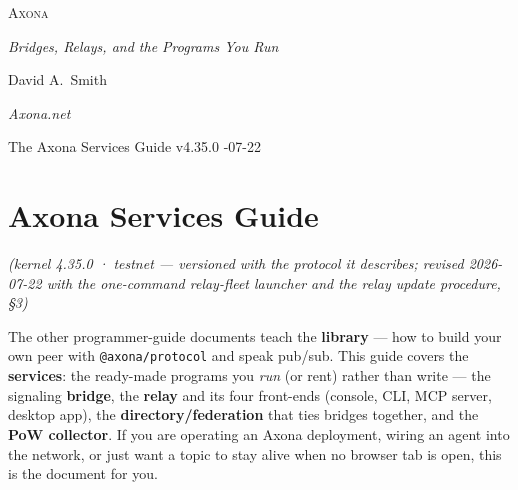 \documentclass[
  nobib]{tufte-handout}
\author{}
\date{}
\begin{document}
\thispagestyle{empty}
\null\vfill
\begin{center}
{\fontsize{48}{52}\selectfont \textsc{Axona}\par}
\vspace{0.6em}
{\Large\itshape Bridges, Relays, and the Programs You Run\par}
\vspace{4em}
{\large David A.~Smith\par}
{\itshape\small Axona.net\par}
\vspace{2em}
{\small The Axona Services Guide \quad v4.35.0 -07-22\par}
\end{center}
\vfill
\null
\newpage
\pagestyle{ndhtplain}
\thispagestyle{ndhtplain}
\setcounter{page}{1}

\section{Axona Services Guide}\label{axona-services-guide}

\emph{(kernel 4.35.0 · testnet --- versioned with the protocol it
describes; revised 2026-07-22 with the one-command relay-fleet launcher
and the relay update procedure, §3)}

The other programmer-guide documents teach the \textbf{library} --- how
to build your own peer with \texttt{@axona/protocol} and speak pub/sub.
This guide covers the \textbf{services}: the ready-made programs you
\emph{run} (or rent) rather than write --- the signaling
\textbf{bridge}, the \textbf{relay} and its four front-ends (console,
CLI, MCP server, desktop app), the \textbf{directory/federation} that
ties bridges together, and the \textbf{PoW collector}. If you are
operating an Axona deployment, wiring an agent into the network, or just
want a topic to stay alive when no browser tab is open, this is the
document for you.
\end{document}
